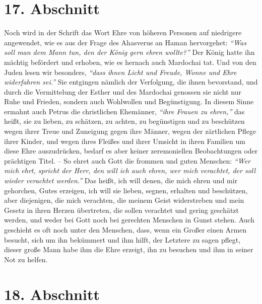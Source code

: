\section{17. Abschnitt} \label{kap9_ab17}

Noch wird in der Schrift das Wort Ehre von höheren Personen auf niedrigere
angewendet, wie es aus der Frage des Ahasverus
an
Haman hervorgehet:
\textit{"`Was soll man
dem Mann tun, den der König gern ehren wollte?"'}
Der König hatte ihn mächtig befördert und erhoben, wie es hernach auch Mardochai
tat. Und von den Juden lesen wir besonders,
\textit{"`dass ihnen Licht und Freude,
Wonne und Ehre widerfahren sei."'}
Sie entgingen nämlich der
Verfolgung, die ihnen bevorstand, und durch die Vermittelung der
Esther und des
Mardochai genossen sie nicht nur Ruhe und Frieden,
sondern auch Wohlwollen und
Begünstigung. In diesem Sinne ermahnt auch Petrus die christlichen Ehemänner,
\textit{"`ihre Frauen zu ehren,"'} das heißt, sie
zu lieben,
zu schätzen, zu achten, zu
begünstigen und zu beschützen wegen ihrer Treue und Zuneigung gegen ihre Männer,
wegen der zärtlichen Pflege ihrer Kinder, und wegen ihres Fleißes und ihrer
Umsicht in ihren Familien um diese Ehre auszudrücken, bedarf es aber keiner
zeremoniellen Beobachtungen oder prächtigen Titel. -- So ehret auch Gott die
frommen und guten Menschen:
\textit{"`Wer mich ehrt, spricht der Herr, den will ich
auch ehren, wer mich verachtet, der soll wieder verachtet werden."'}
Das heißt, ich will denen, die mich ehren und mir gehorchen, Gutes
erzeigen, ich will sie lieben, segnen, erhalten und beschützen, aber diejenigen,
die mich verachten, die meinem Geist widerstreben und mein Gesetz in ihren
Herzen übertreten, die sollen verachtet und
gering geschätzt werden, und weder
bei Gott noch bei gerechten Menschen in Gunst stehen. Auch geschieht es oft
noch unter den Menschen, dass, wenn ein Großer einen Armen besucht, sich um ihn
bekümmert und ihm hilft, der Letztere zu sagen pflegt, dieser große Mann habe
ihm die Ehre erzeigt, ihn zu besuchen und ihm in seiner Not zu helfen.

\section{18. Abschnitt} \label{kap9_ab18}

